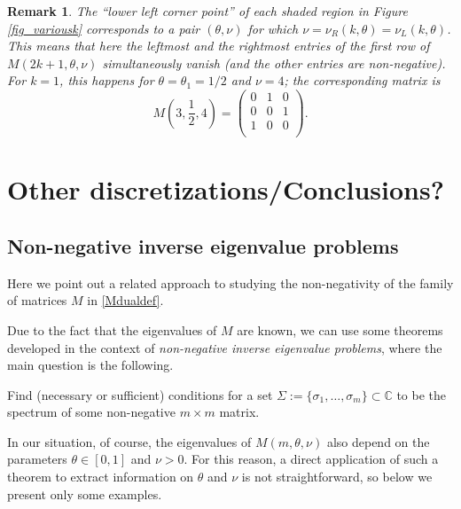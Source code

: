 \documentclass[a4paper]{article}
\newtheorem{remark}{Remark}
\newcommand{\te}{\theta}
\newcommand{\nul}{\nu_L(k,\theta)}
\newcommand{\nur}{\nu_R(k,\theta)}
\begin{document}
\begin{remark}
The ``lower left corner point'' of each shaded region in Figure \ref{fig_variousk} corresponds to a pair 
$(\te,\nu)$  for which $\nu=\nur=\nul$. This means that here the leftmost and the rightmost entries of the first row of $M(2k+1,\te,\nu)$ simultaneously vanish (and the other entries are non-negative). For $k=1$, this happens for $\te=\te_1=1/2$ and $\nu=4$; the corresponding matrix is
\begin{equation}\label{rem10thetahalfmatrix}
M\left(3,\frac{1}{2},4\right)=\left(
\begin{array}{ccc}
 0 & 1 & 0 \\
 0 & 0 & 1 \\
 1 & 0 & 0 \\
\end{array}
\right).
\end{equation}
\end{remark}






\section{Other discretizations/Conclusions?}\label{SNIEP}


\subsection{Non-negative inverse eigenvalue problems}
 
Here we point out a related approach to studying the non-negativity of the family of matrices $M$ in \eqref{Mdualdef}. 

Due to the fact that the eigenvalues of $M$ are known, we can use some theorems developed in the context of \emph{non-negative inverse eigenvalue problems}, where the main question is the following. 
\begin{center} Find (necessary or sufficient) conditions for a set $\Sigma:=\{\sigma_1,\ldots,\sigma_m\}\subset\mathbb{C}$ to be the spectrum of some non-negative $m \times m$ matrix.
\end{center}
In our situation, of course, the eigenvalues of $M(m,\te,\nu)$ also depend on the parameters $\te\in[0,1]$ and $\nu>0$. For this reason, a direct application of such a theorem to extract information on $\te$ and $\nu$ is not straightforward, so below we present only some examples. 
\end{document}
